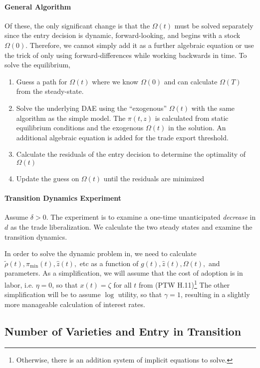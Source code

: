 \documentclass[11pt]{article}
\begin{document}
\paragraph{General Algorithm}
Of these, the only significant change is that the $\Omega(t)$ must be solved separately since the entry decision is dynamic, forward-looking, and begins with a stock $\Omega(0)$.  Therefore, we cannot simply add it as a further algebraic equation or use the trick of only using forward-differences while working backwards in time.  To solve the equilibrium,
\begin{enumerate}
	\item Guess a path for $\Omega(t)$ where we know $\Omega(0)$ and can calculate $\Omega(T)$ from the steady-state.
	\item Solve the underlying DAE using the ``exogenous'' $\Omega(t)$ with the same algorithm as the simple model.  The $\pi(t,z)$ is calculated from static equilibrium conditions and the exogenous $\Omega(t)$ in the solution.  An additional algebraic equation is added for the trade export threshold.
	\item Calculate the residuals of the entry decision to determine the optimality of $\Omega(t)$
	\item Update the guess on $\Omega(t)$ until the residuals are minimized
\end{enumerate}

\paragraph{Transition Dynamics Experiment}

Assume $\delta > 0$. The experiment is to examine a one-time unanticipated \textit{decrease} in $d$ as the trade liberalization.  We calculate the two steady states and examine the transition dynamics.

In order to solve the dynamic problem in, we need to calculate $\tilde{\rho}(t), \pi_{\min}(t),\hat{z}(t),$ etc  as a function of $g(t), \hat{z}(t), \Omega(t),$ and parameters.  As a simplification, we will assume that the cost of adoption is in labor, i.e. $\eta = 0$, so that $x(t) = \zeta$ for all $t$ from (PTW H.11)\footnote{Otherwise, there is an addition system of implicit equations to solve.}  The other simplification will be to assume $\log$ utility, so that $\gamma = 1$, resulting in a slightly more manageable calculation of interest rates.

\subsection{Number of Varieties and Entry in Transition}
\end{document}
